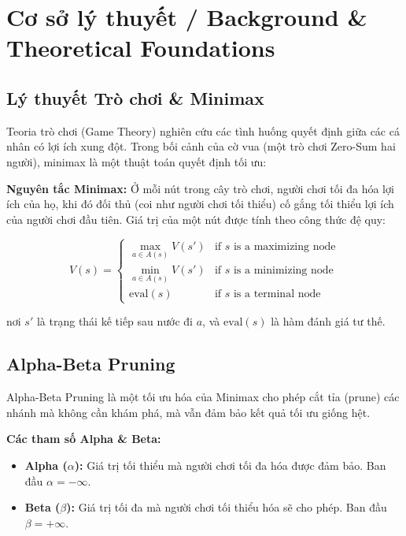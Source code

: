\section{Cơ sở lý thuyết / Background \& Theoretical Foundations}

\subsection{Lý thuyết Trò chơi \& Minimax}
Teoria trò chơi (Game Theory) nghiên cứu các tình huống quyết định giữa các cá nhân có lợi ích xung đột. Trong bối cảnh của cờ vua (một trò chơi Zero-Sum hai người), minimax là một thuật toán quyết định tối ưu:

\textbf{Nguyên tắc Minimax:} Ở mỗi nút trong cây trò chơi, người chơi tối đa hóa lợi ích của họ, khi đó đối thủ (coi như người chơi tối thiểu) cố gắng tối thiểu lợi ích của người chơi đầu tiên. Giá trị của một nút được tính theo công thức đệ quy:

\begin{equation*}
V(s) = \begin{cases}
\max_{a \in A(s)} V(s') & \text{if } s \text{ is a maximizing node} \\
\min_{a \in A(s)} V(s') & \text{if } s \text{ is a minimizing node} \\
\text{eval}(s) & \text{if } s \text{ is a terminal node}
\end{cases}
\end{equation*}

nơi $s'$ là trạng thái kế tiếp sau nước đi $a$, và $\text{eval}(s)$ là hàm đánh giá tư thế.

\subsection{Alpha-Beta Pruning}
Alpha-Beta Pruning là một tối ưu hóa của Minimax cho phép cắt tỉa (prune) các nhánh mà không cần khám phá, mà vẫn đảm bảo kết quả tối ưu giống hệt.

\textbf{Các tham số Alpha \& Beta:}
\begin{itemize}
    \item \textbf{Alpha ($\alpha$):} Giá trị tối thiểu mà người chơi tối đa hóa được đảm bảo. Ban đầu $\alpha = -\infty$.
    \item \textbf{Beta ($\beta$):} Giá trị tối đa mà người chơi tối thiểu hóa sẽ cho phép. Ban đầu $\beta = +\infty$.
\end{itemize}

